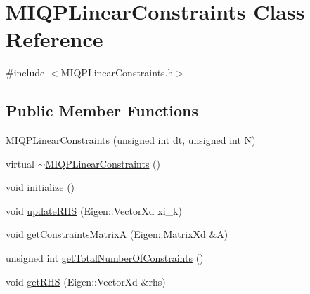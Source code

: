 \hypertarget{classMIQPLinearConstraints}{\section{\-M\-I\-Q\-P\-Linear\-Constraints \-Class \-Reference}
\label{classMIQPLinearConstraints}
}


{\ttfamily \#include $<$\-M\-I\-Q\-P\-Linear\-Constraints.\-h$>$}

\subsection*{\-Public \-Member \-Functions}
\begin{DoxyCompactItemize}
\item 
\hyperlink{classMIQPLinearConstraints_a09f79be23a0269104add07a52c52f90f}{\-M\-I\-Q\-P\-Linear\-Constraints} (unsigned int dt, unsigned int \-N)
\item 
virtual \hyperlink{classMIQPLinearConstraints_a1539d3c8eb2af42daa9bb17dd0f44bd2}{$\sim$\-M\-I\-Q\-P\-Linear\-Constraints} ()
\item 
void \hyperlink{classMIQPLinearConstraints_aea229cfd938c50c5d50ed68d18d119ab}{initialize} ()
\item 
void \hyperlink{classMIQPLinearConstraints_aad3232078ef93e2105a1c619c510f16a}{update\-R\-H\-S} (\-Eigen\-::\-Vector\-Xd xi\-\_\-k)
\item 
void \hyperlink{classMIQPLinearConstraints_ab556e990dcc0b1fcd152f41a8c00e1f6}{get\-Constraints\-Matrix\-A} (\-Eigen\-::\-Matrix\-Xd \&\-A)
\item 
unsigned int \hyperlink{classMIQPLinearConstraints_a656681ab464709b025e4522df3458fa1}{get\-Total\-Number\-Of\-Constraints} ()
\item 
void \hyperlink{classMIQPLinearConstraints_abf2bd3e8f0dfa5b919efa1b90b56232a}{get\-R\-H\-S} (\-Eigen\-::\-Vector\-Xd \&rhs)
\end{DoxyCompactItemize}
